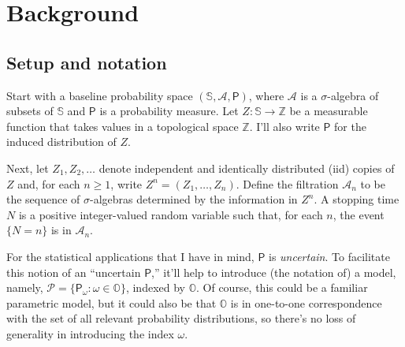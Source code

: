 \documentclass[a4paper, 12pt]{article}
\theoremstyle{plain}
\theoremstyle{definition}
\theoremstyle{remark}
\newcommand{\prob}{\mathsf{P}}
\newcommand{\A}{\mathcal{A}}
\newcommand{\OO}{\mathbb{O}}
\newcommand{\ZZ}{\mathbb{Z}}
\newcommand{\cN}{\mathcal{N}}
\renewcommand{\SS}{\mathbb{S}}
\newcommand{\model}{\mathscr{P}}
\begin{document}






\section{Background}
\label{S:background}

\subsection{Setup and notation}
\label{SS:setup}

Start with a baseline probability space $(\SS, \A, \prob)$, where $\A$ is a $\sigma$-algebra of subsets of $\SS$ and $\prob$ is a probability measure.  Let $Z: \SS \to \ZZ$ be a measurable function that takes values in a topological space $\ZZ$.  
I'll also write $\prob$ for the induced distribution of $Z$.  

Next, let $Z_1, Z_2, \ldots$ denote independent and identically distributed (iid) copies of $Z$ and, for each $n \geq 1$, write $Z^n = (Z_1,\ldots,Z_n)$.  
Define the filtration $\A_n$ to be the sequence of $\sigma$-algebras determined by the information in  $Z^n$.  A stopping time $N$ is a positive integer-valued random variable such that, for each $n$, the event $\{N=n\}$ is in $\A_n$.  


For the statistical applications that I have in mind, $\prob$ is {\em uncertain}.  
To facilitate this notion of an ``uncertain $\prob$,'' it'll help to introduce (the notation of) a model, namely, $\model = \{\prob_\omega: \omega \in \OO\}$, indexed by $\OO$.  Of course, this could be a familiar parametric model, but it could also be that $\OO$ is in one-to-one correspondence with the set of all relevant probability distributions, so there's no loss of generality in introducing the index $\omega$.  
\end{document}
